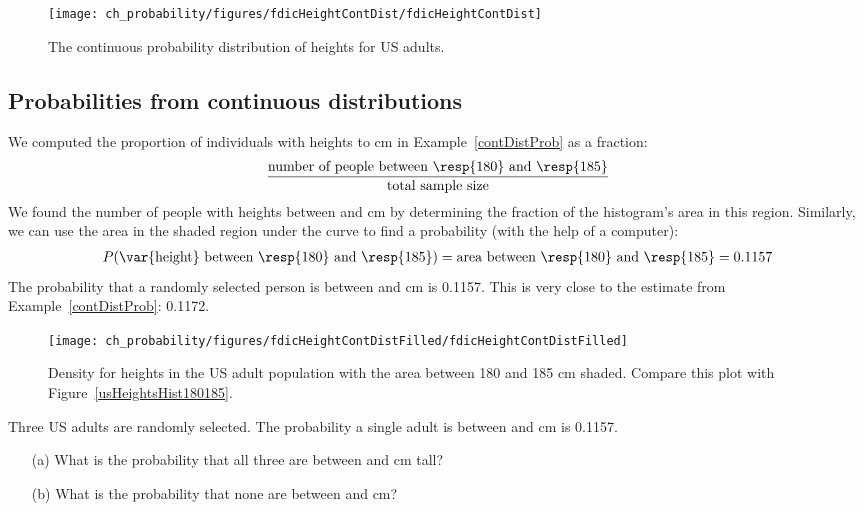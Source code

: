 \begin{figure}[tbh]
\centering
\texttt{[image: ch\_probability/figures/fdicHeightContDist/fdicHeightContDist]}
\caption{The continuous probability distribution of heights for US adults.}
\label{fdicHeightContDist}
\end{figure}


\subsection{Probabilities from continuous distributions}

We computed the proportion of individuals with heights  to  cm in Example~\ref{contDistProb} as a fraction:
\begin{eqnarray*}
\frac{\text{number of people between \resp{180} and \resp{185}}}{\text{total sample size}}
\end{eqnarray*}
We found the number of people with heights between  and  cm by determining the fraction of the histogram's area in this region. Similarly, we can use the area in the shaded region under the curve to find a probability (with the help of a computer):
\begin{eqnarray*}
P(\text{\var{height} between \resp{180} and \resp{185}})
	= \text{area between \resp{180} and \resp{185}}
	= 0.1157
\end{eqnarray*}
The probability that a randomly selected person is between  and  cm is 0.1157. This is very close to the estimate from Example~\ref{contDistProb}: 0.1172. 

\begin{figure}
\centering
\texttt{[image: ch\_probability/figures/fdicHeightContDistFilled/fdicHeightContDistFilled]}
\caption{Density for heights in the US adult population with the area between 180 and 185 cm shaded. Compare this plot with Figure~\ref{usHeightsHist180185}.}
\label{fdicHeightContDistFilled}
\end{figure}

\begin{exercisewrap}
\begin{nexercise}
Three US adults are randomly selected. The probability a single adult is between  and  cm is 0.1157.\footnotemark\vspace{-1.5mm}
\begin{enumerate}
\setlength{\itemsep}{0mm}
\item[(a)] What is the probability that all three are between  and  cm tall?
\item[(b)] What is the probability that none are between  and  cm?
\end{enumerate}
\end{nexercise}
\end{exercisewrap}

